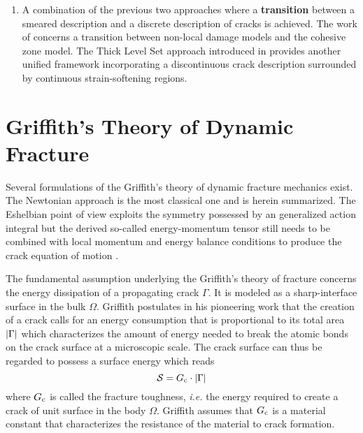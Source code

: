 \begin{enumerate}
\item A combination of the previous two approaches where a \textbf{transition} between a smeared description and a discrete description of cracks is achieved. The work of \cite{BorstRemmersNeedlemanAbellan:2004,CazesCoretCombescureGravouil:2009,CuvilliezFeyelLorentzMichel-Ponnelle:2012} concerns a transition between non-local damage models and the cohesive zone model. The Thick Level Set approach introduced in \cite{MoesStolzBernardChevaugeon:2011,MoreauMoesPicartStainier:2015} provides another unified framework incorporating a discontinuous crack description surrounded by continuous strain-softening regions.
\end{enumerate}

\section{Griffith's Theory of Dynamic Fracture} \label{sec:griffithfreund}
Several formulations of the Griffith's theory of dynamic fracture mechanics exist. The Newtonian approach \cite{Freund:1990} is the most classical one and is herein summarized. The Eshelbian point of view \cite{Eshelby:1975} exploits the symmetry possessed by an generalized action integral but the derived so-called energy-momentum tensor still needs to be combined with local momentum and energy balance conditions to produce the crack equation of motion \cite{Maugin:1994,Adda-BediaAriasAmarLund:1999}.

The fundamental assumption underlying the Griffith's theory of fracture concerns the energy dissipation of a propagating crack $\Gamma$. It is modeled as a sharp-interface surface in the bulk $\Omega$. Griffith postulates in his pioneering work \cite{Griffith:1921} that the creation of a crack calls for an energy consumption that is proportional to its total area $\left\lvert{\Gamma}\right\rvert$ which characterizes the amount of energy needed to break the atomic bonds on the crack surface at a microscopic scale. The crack surface can thus be regarded to possess a surface energy which reads
\begin{equation} \label{eq:StGriffith}
\mathcal{S}=G_\mathrm{c}\cdot\left\lvert{\Gamma}\right\rvert
\end{equation}
where $G_\mathrm{c}$ is called the fracture toughness, \emph{i.e.} the energy required to create a crack of unit surface in the body $\Omega$. Griffith assumes that $G_\mathrm{c}$ is a material constant that characterizes the resistance of the material to crack formation.

